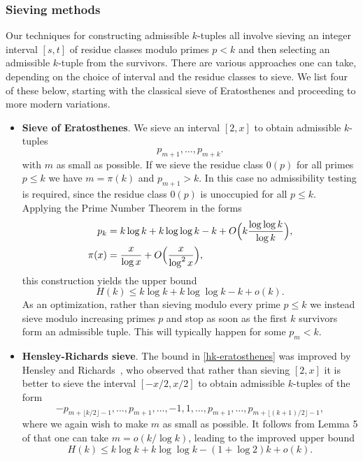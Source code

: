 \documentclass{bmcart}
\theoremstyle{plain}
\theoremstyle{definition}
\begin{document}
\subsubsection{Sieving methods}

Our techniques for constructing admissible $k$-tuples all involve sieving an integer interval $[s,t]$ of residue classes modulo primes $p < k$ and then selecting an admissible $k$-tuple from the survivors.  There are various approaches one can take, depending on the choice of interval and the residue classes to sieve.
We list four of these below, starting with the classical sieve of Eratosthenes and proceeding to more modern variations.

\begin{itemize}
\item\textbf{Sieve of Eratosthenes}.
We sieve an interval $[2,x]$ to obtain admissible $k$-tuples
\[
p_{m+1},\ldots,p_{m+k}.
\]
with $m$ as small as possible.
If we sieve the residue class $0(p)$ for all primes $p\le k$ we have $m=\pi(k)$ and $p_{m+1}>k$. In this case no admissibility testing is required, since the residue class $0(p)$ is unoccupied for all $p \le k$.
Applying the Prime Number Theorem in the forms
\begin{align*}
p_k &=k \log k+ k \log \log k - k +O\Bigl(k \frac{ \log \log k}{\log k} \Bigr),\\
\pi(x)&=\frac{x}{\log x}+O\Bigl(\frac{x}{\log^2 x}\Bigr),
\end{align*}
this construction yields the upper bound
\begin{equation}\label{hk-eratosthenes}
H(k)\le k\log k + k\log\log k  - k + o(k).
\end{equation}
As an optimization, rather than sieving modulo every prime $p \le k$ we instead sieve modulo increasing primes $p$ and stop as soon as the first $k$ survivors form an admissible tuple.
This will typically happen for some $p_m < k$.
\smallbreak

\item\textbf{Hensley-Richards sieve}.
The bound in \eqref{hk-eratosthenes} was improved by Hensley and Richards~\cite{hensley,
  hensley-2, richards}, who observed that rather than sieving $[2,x]$ it is better to sieve the interval $[-x/2,x/2]$ to obtain admissible $k$-tuples of the form
\[
-p_{m+\lfloor k/2\rfloor-1},\ldots,p_{m+1},\ldots,-1,1,\ldots,p_{m+1},\ldots,p_{m+\lfloor(k+1)/2\rfloor-1},
\]
where we again wish to make $m$ as small as possible.
It follows from Lemma 5 of \cite{hensley-2} that one can take $m=o(k/\log k)$, leading to the improved upper bound
\begin{equation}\label{hk-hensely-richards}
H(k)\le k\log k + k\log\log k -(1+\log 2)k + o(k).
\end{equation}
\smallbreak


\end{itemize}
\end{document}
